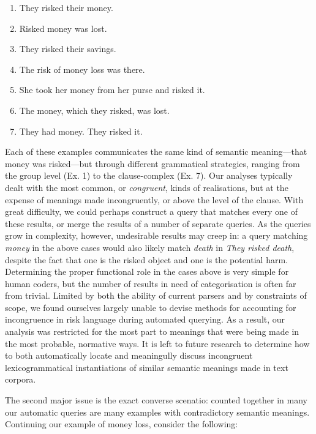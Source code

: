         \begin{enumerate} [before=\color{black}\ttfamily] \setlength\itemsep{0em} \small \setlength\itemsep{0em} \small
            \item They risked their money.
            \item Risked money was lost.
            \item They risked their savings.
            \item The risk of money loss was there.
            \item She took her money from her purse and risked it.
            \item The money, which they risked, was lost.
            \item They had money. They risked it.
        \end{enumerate}
        Each of these examples communicates the same kind of semantic meaning---that money was risked---but through different grammatical strategies, ranging from the group level (Ex. 1) to the clause-complex (Ex. 7). Our analyses typically dealt with the most common, or \emph{congruent}, kinds of realisations, but at the expense of meanings made incongruently, or above the level of the clause. With great difficulty, we could perhaps construct a query that matches every one of these results, or merge the results of a number of separate queries. As the queries grow in complexity, however, undesirable results may creep in: a query matching \emph{money} in the above cases would also likely match \emph{death} in \emph{They risked death}, despite the fact that one is the risked object and one is the potential harm. Determining the proper functional role in the cases above is very simple for human coders, but the number of results in need of categorisation is often far from trivial. Limited by both the ability of current parsers and by constraints of scope, we found ourselves largely unable to devise methods for accounting for incongruence in risk language during automated querying. As a result, our analysis was restricted for the most part to meanings that were being made in the most probable, normative ways. It is left to future research to determine how to both automatically locate and meaningully discuss incongruent lexicogrammatical instantiations of similar semantic meanings made in text corpora.

        The second major issue is the exact converse scenatio: counted together in many our automatic queries are many examples with contradictory semantic meanings. Continuing our example of money loss, consider the following:

